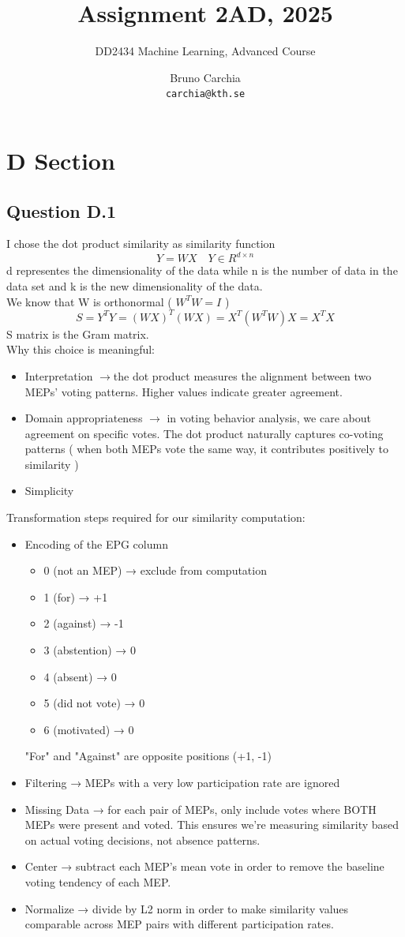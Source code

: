 \documentclass[a4paper]{scrartcl}
\title{Assignment 2AD, 2025}
\subtitle{DD2434 Machine Learning, Advanced Course}
\author{
Bruno Carchia \\
\texttt{carchia@kth.se}
}
\begin{document}
\maketitle

\section*{D Section}
\subsection*{Question D.1}
I chose the dot product similarity as similarity function
\[
Y = W X \quad Y \in R^{d \times n} 
\]
d representes the dimensionality of the data while n is the number of data in the data set and k is the new dimensionality of the data.\\
We know that W is orthonormal ( $W^TW = I$ )
\[
S = Y^T Y = (W X)^T (W X) = X^T ( W^T W ) X = X^T X
\]
S matrix is the Gram matrix.\\
Why this choice is meaningful:
\begin{itemize}
    \item Interpretation \(\rightarrow\)the dot product measures the alignment between two MEPs' voting patterns. Higher values indicate greater agreement.
    \item Domain appropriateness \(\rightarrow\) in voting behavior analysis, we care about agreement on specific votes. The dot product naturally captures co-voting patterns ( when both MEPs vote the same way, it contributes positively to similarity )
    \item Simplicity
\end{itemize}
Transformation steps required for our similarity computation:
\begin{itemize}
    \item Encoding of the EPG column 
    \begin{itemize}
        \item 0 (not an MEP) → exclude from computation
        \item 1 (for) →  +1
        \item 2 (against) → -1
        \item 3 (abstention) → 0
        \item 4 (absent) → 0
        \item 5 (did not vote) → 0
        \item 6 (motivated) → 0 
    \end{itemize}
"For" and "Against" are opposite positions (+1, -1) 
    \item Filtering → MEPs with a very low participation rate are ignored
    \item Missing Data → for each pair of MEPs, only include votes where BOTH MEPs were present and voted. This ensures we're measuring similarity based on actual voting decisions, not absence patterns.
    \item Center → subtract each MEP's mean vote in order to remove the baseline voting tendency of each MEP.
    \item Normalize → divide by L2 norm in order to make similarity values comparable across MEP pairs with different participation rates.
\end{itemize}
\end{document}
